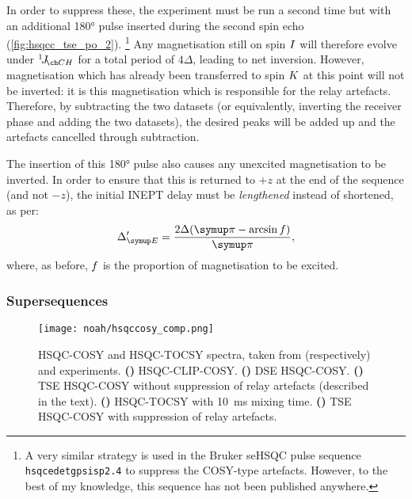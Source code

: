 In order to suppress these, the experiment must be run a second time but with an additional \ang{180} \carbon{} pulse inserted during the second spin echo (\cref{fig:hsqcc_tse_po_2}).%
\footnote{A very similar strategy is used in the Bruker seHSQC pulse sequence \texttt{hsqcedetgpsisp2.4} to suppress the COSY-type artefacts. However, to the best of my knowledge, this sequence has not been published anywhere.}
Any magnetisation still on spin $I\/$ will therefore evolve under $\oneJ{CH}$ for a total period of $4\Delta$, leading to net inversion.
However, magnetisation which has already been transferred to spin $K\/$ at this point will not be inverted: it is this magnetisation which is responsible for the relay artefacts.
Therefore, by subtracting the two datasets (or equivalently, inverting the receiver phase and adding the two datasets), the desired peaks will be added up and the artefacts cancelled through subtraction.

The insertion of this \ang{180} pulse also causes any unexcited  magnetisation to be inverted.
In order to ensure that this is returned to $+z$ at the end of the sequence (and not $-z$), the initial INEPT delay must be \textit{lengthened} instead of shortened, as per:
\begin{equation}
    \label{eq:delta_e_prime}
    \DeltaE' = \frac{2\Delta (\cpi - \arcsin f)}{\cpi},
\end{equation}
where, as before, $f\/$ is the proportion of magnetisation to be excited.


\subsubsection{Supersequences}

\begin{figure}[!htp]
    \centering
    \texttt{[image: noah/hsqccosy\_comp.png]}%
    {\label{fig:hsqccosy_comp_clip}}%
    {\label{fig:hsqccosy_comp_dse}}%
    {\label{fig:hsqccosy_comp_tse_norps}}%
    {\label{fig:hsqccosy_comp_tocsy}}%
    {\label{fig:hsqccosy_comp_tse}}%
    \caption[Comparison of spectra acquired with different HSQC-COSY modules]{
        HSQC-COSY and HSQC-TOCSY spectra, taken from (respectively)  and  experiments.
        \textbf{()} HSQC-CLIP-COSY.
        \textbf{()} DSE HSQC-COSY.
        \textbf{()} TSE HSQC-COSY without suppression of relay artefacts (described in the text).
        \textbf{()} HSQC-TOCSY with \qty{10}{\ms} mixing time.
        \textbf{()} TSE HSQC-COSY with suppression of relay artefacts.
    }
    \label{fig:hsqccosy_comp}
\end{figure}


